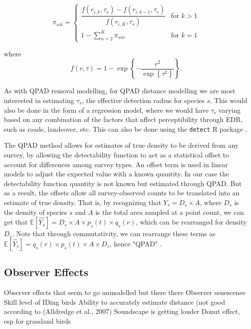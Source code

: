 \begin{equation*}
	\pi_{sik} = 
	\begin{cases}
		\dfrac{f(r_{i,k}, \tau_s) - f(r_{i,k-1}, \tau_s)}{f(r_{i,K}, \tau_s)} & \text{for } k > 1 \\
		1 - \sum_{n = 2}^{K} \pi_{sin} & \text{for } k = 1
	\end{cases}
\end{equation*}

where 
$$f(r,\tau) =  1 - \exp\left\{ -\dfrac{r^2}{\exp\left\{\tau^2\right\}} \right\}.$$

\par As with QPAD removal modelling, for QPAD distance modelling we are most interested in estimating $\tau_s$, the effective detection radius for species $s$. 
This would also be done in the form of a regression model, where we would have $\tau_s$ varying based on any combination of the factors that affect perceptibility through EDR, such as roads, landcover, etc.
This can also be done using the \texttt{detect} R package \citep{solymos_detect_2020}.

\par The QPAD method allows for estimates of true density to be derived from any survey, by allowing the detectability function to act as a statistical offset to account for differences among survey types. An offset term is used in linear models to adjust the expected value with a known quantity. In our case the detectability function quantity is not known but estimated through QPAD. But as a result, the offsets allow all survey-observed counts to be translated into an estimate of true density. That is, by recognizing that $Y_s = D_s \times A$, where $D_s$ is the density of species $s$ and $A$ is the total area sampled at a point count, we can get that $\mathbb{E}\left[\hat{Y_s}\right] = D_s \times A \times p_s(t) \times q_s(r)$, which can be rearranged for density $D_s$. Note that through commutativity, we can rearrange these terms as $\mathbb{E}\left[\hat{Y_s}\right] = q_s(r) \times p_s(t) \times A \times D_s$, hence "QPAD" \citep{solymos_calibrating_2013}.

\subsection{Observer Effects} 
Observer effects that seem to go unmodelled but there there 
Observer senescence 
Skill level of IDing birds 
Ability to accurately estimate distance (not good according to (Alldredge et al., 2007) 
Soundscape is getting louder 
Donut effect, esp for grassland birds 

